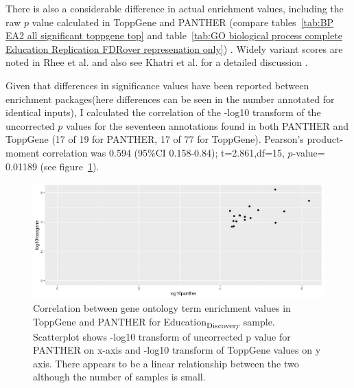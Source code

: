  There is also a considerable difference in actual enrichment values, including the raw $p$ value calculated in ToppGene and PANTHER (compare tables~\ref{tab:BP EA2 all significant toppgene top} and table~\ref{tab:GO biological process complete Education Replication FDRover represenation only}) . Widely variant scores are noted in Rhee et al.\cite{rhee2008use} and also see Khatri et al. for a detailed discussion \cite{khatri2005ontological}.

Given that differences in significance values have been reported between enrichment packages\cite{khatri2005ontological}(here differences can be seen in the number annotated for identical inputs), I calculated  the correlation of the -log10 transform of the uncorrected $p$ values for the seventeen annotations found in both PANTHER and ToppGene (17 of 19 for PANTHER, 17 of 77 for ToppGene). Pearson's product-moment correlation was 0.594 (95\%CI 0.158-0.84); t=2.861,df=15, $p$-value= 0.01189 (see figure~\ref{fig:correlation of gene ontology terms between toppgene and panther}). 

\begin{figure}
    \centering
    \includegraphics[width=\textwidth]{images/chapter2/strontium/Rplot_compare_toppgene_panther.png}
    \caption{Correlation between gene ontology term enrichment values in ToppGene and PANTHER for Education\textsubscript{Discovery} sample. Scatterplot shows -log10 transform of uncorrected p value for PANTHER on x-axis and -log10 transform of ToppGene values on y axis. There appears to be a linear relationship between the two although the number of samples is small.}
    \label{fig:correlation of gene ontology terms between toppgene and panther}
\end{figure}



